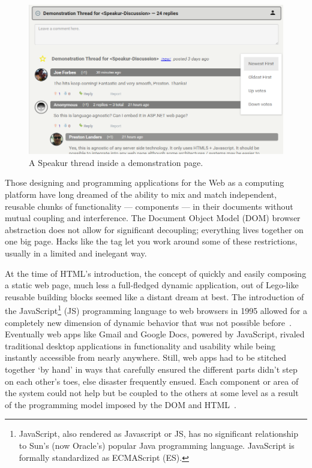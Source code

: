 \begin{figure}[htb]
\centering
 \includegraphics[width=\textwidth]{images/screenshot_20150312_1630_v2.png}
\caption{A Speakur thread inside a demonstration page.}
\label{f:demo1}
\end{figure}

Those designing and programming applications for the Web as a computing platform have long dreamed of the ability to mix and match independent, reusable chunks of functionality --- components --- in their documents without mutual coupling and interference. 
The Document Object Model (DOM)
browser abstraction does not allow for significant decoupling; 
everything lives together on one big page. Hacks like the 
tag let you work around some of these restrictions, usually in a limited and inelegant way.

At the time of HTML's introduction, the concept of quickly and easily composing a static web page, 
much less a full-fledged dynamic application, 
out of Lego-like reusable building blocks seemed like a distant dream at best. 
The introduction of the 
JavaScript\footnote{JavaScript, also rendered as Javascript or JS, 
has no significant relationship to Sun's (now Oracle's) popular Java programming language. JavaScript is formally standardized as ECMAScript (ES).}
(JS) programming language to web browsers in 1995 allowed for a completely new dimension of dynamic behavior that was not possible before~\cite{w3ccontributors2012}.
Eventually web apps like Gmail and Google Docs, powered by JavaScript, rivaled traditional desktop applications in functionality and usability while being instantly accessible from nearly anywhere.
Still, web apps had to be stitched together `by hand' in ways that carefully ensured the different parts didn't step on each other's toes, else disaster frequently ensued. 
Each component or area of the system could not help but be coupled to the others at some level as a result of the programming model imposed by the DOM and HTML~\cite{ihrig2012}.

